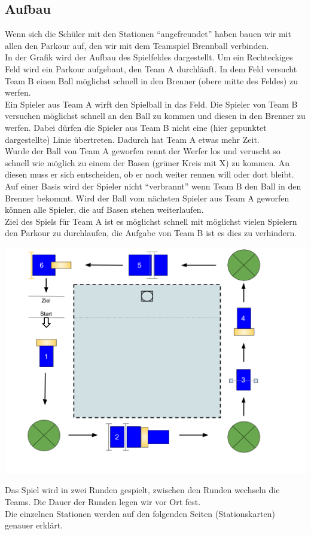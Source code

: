 \documentclass[ngerman,12pt,titlepage]{scrartcl}
\begin{document}
\subsection{Aufbau}
Wenn sich die Schüler mit den Stationen \enquote{angefreundet} haben bauen wir mit allen den Parkour auf, den wir mit dem Teamspiel Brennball verbinden. \\ In der Grafik wird der Aufbau des Spielfeldes dargestellt. Um ein Rechteckiges Feld wird ein Parkour aufgebaut, den Team A durchläuft. In dem Feld versucht Team B einen Ball möglichst schnell in den Brenner (obere mitte des Feldes) zu werfen. \\ Ein Spieler aus Team A wirft den Spielball in das Feld. Die Spieler von Team B versuchen möglichst schnell an den Ball zu kommen und diesen in den Brenner zu werfen. Dabei dürfen die Spieler aus Team B nicht eine (hier gepunktet dargestellte) Linie übertreten. Dadurch hat Team A etwas mehr Zeit. \\ Wurde der Ball von Team A geworfen rennt der Werfer los und veruscht so schnell wie möglich zu einem der Basen (grüner Kreis mit X) zu kommen. An diesen muss er sich entscheiden, ob er noch weiter rennen will oder dort bleibt. \\ Auf einer Basis wird der Spieler nicht \enquote{verbrannt} wenn Team B den Ball in den Brenner bekommt. Wird der Ball vom nächsten Spieler aus Team A geworfen können alle Spieler, die auf Basen stehen weiterlaufen. \\  Ziel des Spiels für Team A ist es möglichst schnell mit möglichst vielen Spielern den Parkour zu durchlaufen, die Aufgabe von Team B ist es dies zu verhindern.  
  
\begin{center}
\includegraphics[width=0.9\linewidth]{brennball}
\end{center}
Das Spiel wird in zwei Runden gespielt, zwischen den Runden wechseln die Teams. Die Dauer der Runden legen wir vor Ort fest.
\\
Die einzelnen Stationen werden auf den folgenden Seiten (Stationskarten) genauer erklärt.
\end{document}

